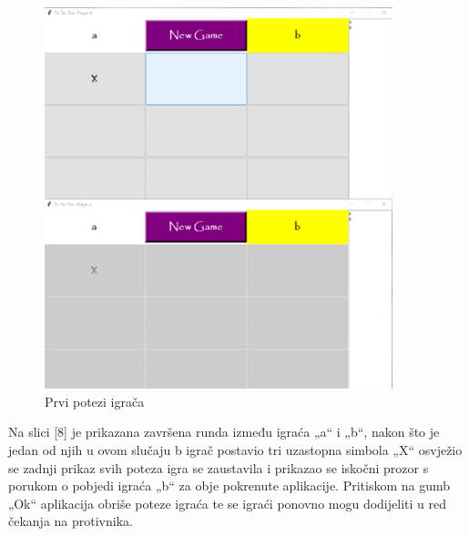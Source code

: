 \documentclass[]{foi} %
\begin{document}
\begin{figure}[]
    \centering
    \includegraphics[width=0.9\textwidth]{slike/igranje_3.png}
    \caption{Prvi potezi igrača \cite{Vlastita izrada}}
    \label{fig:podjela}
\end{figure}


Na slici [8] je prikazana završena runda između igraća „a“ i „b“, nakon što je jedan od njih u ovom slučaju b igrač postavio tri uzastopna simbola „X“ osvježio se zadnji prikaz svih poteza igra se zaustavila i prikazao se iskočni prozor s porukom o pobjedi igraća „b“ za obje pokrenute aplikacije. Pritiskom na gumb „Ok“ aplikacija obriše poteze igraća te se igraći ponovno mogu dodijeliti u red čekanja na protivnika.
\end{document}
